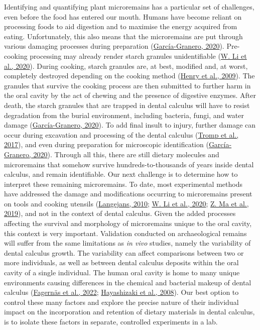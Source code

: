 \documentclass[
  letterpaper,
]{book}
\begin{document}
Identifying and quantifying plant microremains has a particular set of
challenges, even before the food has entered our mouth. Humans have
become reliant on processing foods to aid digestion and to maximise the
energy acquired from eating. Unfortunately, this also means that the
microremains are put through various damaging processes during
preparation
(\protect\hyperlink{ref-graneroStarchTaphonomy2020}{García-Granero,
2020}). Pre-cooking processing may already render starch granules
unidentifiable (\protect\hyperlink{ref-liInfluenceGrinding2020}{W. Li et
al., 2020}). During cooking, starch granules are, at best, modified and,
at worst, completely destroyed depending on the cooking method
(\protect\hyperlink{ref-henryCookingStarch2009}{Henry et al., 2009}).
The granules that survive the cooking process are then submitted to
further harm in the oral cavity by the act of chewing and the presence
of digestive enzymes. After death, the starch granules that are trapped
in dental calculus will have to resist degradation from the burial
environment, including bacteria, fungi, and water damage
(\protect\hyperlink{ref-graneroStarchTaphonomy2020}{García-Granero,
2020}). To add final insult to injury, further damage can occur during
excavation and processing of the dental calculus
(\protect\hyperlink{ref-trompEDTACalculus2017}{Tromp et al., 2017}), and
even during preparation for microscopic identification
(\protect\hyperlink{ref-graneroStarchTaphonomy2020}{García-Granero,
2020}). Through all this, there are still dietary molecules and
microremains that somehow survive hundreds-to-thousands of years inside
dental calculus, and remain identifiable. Our next challenge is to
determine how to interpret these remaining microremains. To date, most
experimental methods have addressed the damage and modifications
occurring to microremains present on tools and cooking utensils
(\protect\hyperlink{ref-langejansRemainsDay2010}{Langejans, 2010};
\protect\hyperlink{ref-liInfluenceGrinding2020}{W. Li et al., 2020};
\protect\hyperlink{ref-maMorphologicalChanges2019}{Z. Ma et al., 2019}),
and not in the context of dental calculus. Given the added processes
affecting the survival and morphology of microremains unique to the oral
cavity, this context is very important. Validation conducted on
archaeological remains will suffer from the same limitations as \emph{in
vivo} studies, namely the variability of dental calculus growth. The
variability can affect comparisons between two or more individuals, as
well as between dental calculus deposits within the oral cavity of a
single individual. The human oral cavity is home to many unique
environments causing differences in the chemical and bacterial makeup of
dental calculus
(\protect\hyperlink{ref-fagernasMicrobialBiogeography2022}{Fagernäs et
al., 2022};
\protect\hyperlink{ref-hayashizakiSiteSpecific2008}{Hayashizaki et al.,
2008}). Our best option to control these many factors and explore the
precise nature of their individual impact on the incorporation and
retention of dietary materials in dental calculus, is to isolate these
factors in separate, controlled experiments in a lab.
\end{document}
